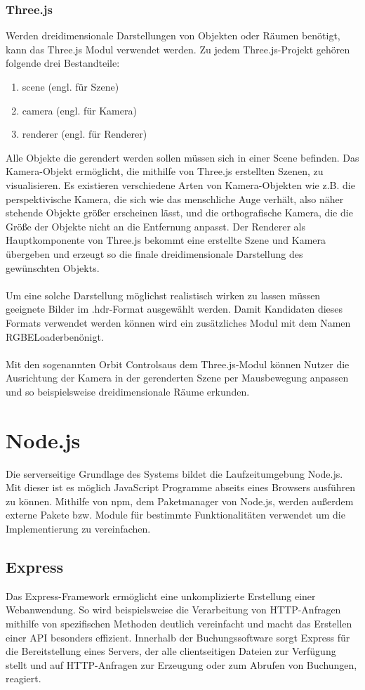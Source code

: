 \subsubsection{Three.js}
Werden dreidimensionale Darstellungen von Objekten oder Räumen benötigt, kann das Three.js Modul verwendet werden.
Zu jedem Three.js-Projekt gehören folgende drei Bestandteile:
\begin{enumerate}
	\item scene (engl. für Szene)
	\item camera (engl. für Kamera)
	\item renderer (engl. für Renderer)
\end{enumerate}
Alle Objekte die gerendert werden sollen müssen sich in einer Scene befinden. Das Kamera-Objekt ermöglicht, die mithilfe von Three.js erstellten Szenen, zu visualisieren. Es existieren verschiedene Arten von Kamera-Objekten wie z.B. die perspektivische Kamera, die sich wie das menschliche Auge verhält, also näher stehende Objekte größer erscheinen lässt, und die orthografische Kamera, die die Größe der Objekte nicht an die Entfernung anpasst. Der Renderer als Hauptkomponente von Three.js bekommt eine erstellte Szene und Kamera übergeben und erzeugt so die finale dreidimensionale Darstellung des gewünschten Objekts.
\\
\\
Um eine solche Darstellung möglichst realistisch wirken zu lassen müssen geeignete Bilder im \glqq .hdr\grqq -Format ausgewählt werden. Damit Kandidaten dieses Formats verwendet werden können wird ein zusätzliches Modul mit dem Namen \glqq RGBELoader\grqq benönigt. 
\\
\\
Mit den sogenannten \glqq Orbit Controls\grqq \thinspace aus dem Three.js-Modul können Nutzer die Ausrichtung der Kamera in der gerenderten Szene per Mausbewegung anpassen und so beispielsweise dreidimensionale Räume erkunden.

\section{Node.js}
Die serverseitige Grundlage des Systems bildet die Laufzeitumgebung Node.js. Mit dieser ist es möglich JavaScript Programme abseits eines Browsers ausführen zu können. Mithilfe von \glqq npm\grqq, dem Paketmanager von Node.js, werden außerdem externe Pakete bzw. Module für bestimmte Funktionalitäten verwendet um die Implementierung zu vereinfachen.

\subsection{Express}
Das Express-Framework ermöglicht eine unkomplizierte Erstellung einer Webanwendung. So wird beispielsweise die Verarbeitung von HTTP-Anfragen mithilfe von spezifischen Methoden deutlich vereinfacht und macht das Erstellen einer API besonders effizient. Innerhalb der Buchungssoftware sorgt Express für die Bereitstellung eines Servers, der alle clientseitigen Dateien zur Verfügung stellt und auf HTTP-Anfragen zur Erzeugung oder zum Abrufen von Buchungen, reagiert.

